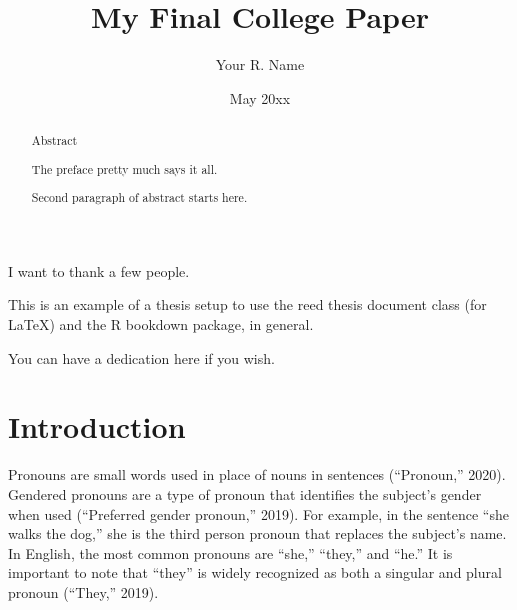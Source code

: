 \documentclass[12pt,twoside]{reedthesis}
\title{My Final College Paper}
\author{Your R. Name}
\date{May 20xx}
\begin{document}
  \maketitle

\frontmatter %
\pagestyle{empty} %
  \begin{acknowledgements}
    I want to thank a few people.
  \end{acknowledgements}
  \begin{preface}
    This is an example of a thesis setup to use the reed thesis document class
    (for LaTeX) and the R bookdown package, in general.
  \end{preface}
  \hypersetup{linkcolor=black}
  \setcounter{tocdepth}{2}
  \tableofcontents

  \listoftables

  \listoffigures
  \begin{abstract}
    \hypertarget{abstract}{%
    \chapter{Abstract}\label{abstract}}
    
    The preface pretty much says it all.
    
    \par
    
    Second paragraph of abstract starts here.
  \end{abstract}
  \begin{dedication}
    You can have a dedication here if you wish.
  \end{dedication}
\mainmatter %
\pagestyle{fancyplain} %

\hypertarget{introduction}{%
\chapter*{Introduction}\label{introduction}}

Pronouns are small words used in place of nouns in sentences (``Pronoun,'' 2020). Gendered pronouns are a type of pronoun that identifies the subject's gender when used (``Preferred gender pronoun,'' 2019). For example, in the sentence ``she walks the dog,'' she is the third person pronoun that replaces the subject's name. In English, the most common pronouns are ``she,'' ``they,'' and ``he.'' It is important to note that ``they'' is widely recognized as both a singular and plural pronoun (``They,'' 2019).
\end{document}
